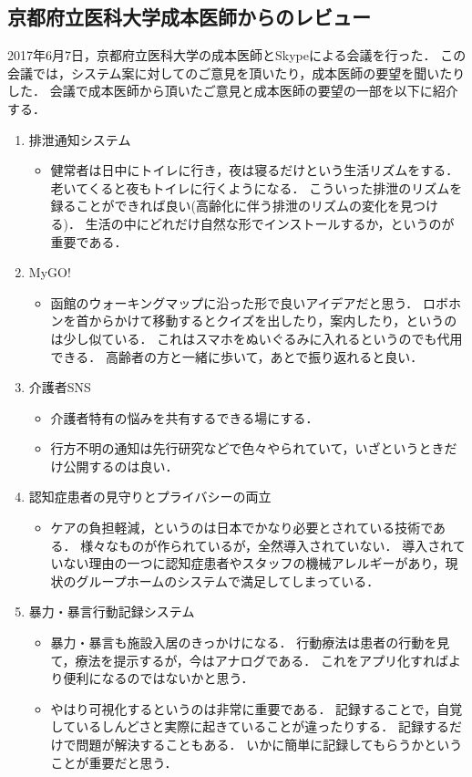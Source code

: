 \documentclass[../report]{subfiles}
\begin{document}
\subsection{京都府立医科大学成本医師からのレビュー}
2017年6月7日，京都府立医科大学の成本医師とSkypeによる会議を行った．
この会議では，システム案に対してのご意見を頂いたり，成本医師の要望を聞いたりした．
会議で成本医師から頂いたご意見と成本医師の要望の一部を以下に紹介する．

\begin{enumerate}
    \item[] 排泄通知システム
\begin{itemize}
    \item 健常者は日中にトイレに行き，夜は寝るだけという生活リズムをする．
老いてくると夜もトイレに行くようになる．
こういった排泄のリズムを録ることができれば良い(高齢化に伴う排泄のリズムの変化を見つける)．
生活の中にどれだけ自然な形でインストールするか，というのが重要である．
\end{itemize}

    \item[] MyGO!
\begin{itemize}
    \item 函館のウォーキングマップに沿った形で良いアイデアだと思う．
ロボホンを首からかけて移動するとクイズを出したり，案内したり，というのは少し似ている．
これはスマホをぬいぐるみに入れるというのでも代用できる．
高齢者の方と一緒に歩いて，あとで振り返れると良い．
\end{itemize}

    \item[] 介護者SNS
\begin{itemize}
    \item 介護者特有の悩みを共有するできる場にする．
    \item 行方不明の通知は先行研究などで色々やられていて，いざというときだけ公開するのは良い．
\end{itemize}

    \item[] 認知症患者の見守りとプライバシーの両立
\begin{itemize}
    \item ケアの負担軽減，というのは日本でかなり必要とされている技術である．
様々なものが作られているが，全然導入されていない．
導入されていない理由の一つに認知症患者やスタッフの機械アレルギーがあり，現状のグループホームのシステムで満足してしまっている．
\end{itemize}

    \item[] 暴力・暴言行動記録システム
\begin{itemize}
    \item 暴力・暴言も施設入居のきっかけになる．
行動療法は患者の行動を見て，療法を提示するが，今はアナログである．
これをアプリ化すればより便利になるのではないかと思う．
    \item やはり可視化するというのは非常に重要である．
記録することで，自覚しているしんどさと実際に起きていることが違ったりする．
記録するだけで問題が解決することもある．
いかに簡単に記録してもらうかということが重要だと思う．
\end{itemize}


\end{enumerate}
\end{document}
